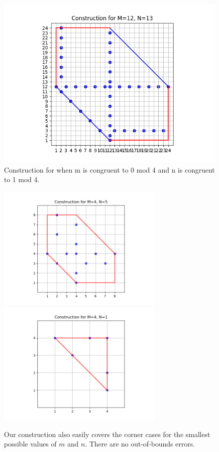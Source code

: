 \documentclass[10pt]{../usamts}
\begin{document}
\begin{solution}
\begin{figure}[htbp]
\centering
    \includegraphics[width=12cm]{round2/p5construct/construct_12_13.png}
    \caption{Construction for when m is congruent to 0 mod 4 and n is congruent to 1 mod 4.}
    \label{fig:zerooneconstruct}
\end{figure}

\begin{figure}[htbp]
\centering
    \includegraphics[width=8cm]{round2/p5construct/construct_4_1.png}
    \includegraphics[width=8cm]{round2/p5construct/construct_4_5.png}
    \caption{Our construction also easily covers the corner cases for the smallest possible values of $m$ and $n$. There are no out-of-bounds errors.}
\end{figure}


\end{solution}
\end{document}
